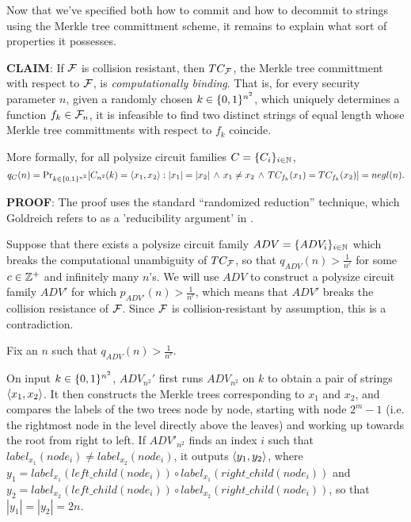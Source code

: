 \documentclass[12pt,twoside]{article}
\begin{document}
Now that we've specified both how to commit and how to decommit to strings 
using the Merkle tree committment scheme, it remains to explain what sort of 
properties it possesses. 

\medskip \noindent
{\bf CLAIM}: If $\fanf$ is collision resistant, then $TC_\fanf$, the Merkle 
tree committment with respect to $\fanf$, is {\it computationally binding}. 
That is, for every security parameter $n$, given a randomly chosen $k \in 
\strs{n^2}$, which uniquely determines a function $f_k \in \fanf_n$, it is 
infeasible to find two distinct strings of equal length whose Merkle tree 
committments with respect to $f_k$ coincide. 

More formally, for all polysize circuit families $C = \ens{C}{i}$, 
\[
q_C(n) = \pr{C_{n^2}(k) = \enc{x_1,x_2} : 
|x_1| = |x_2| \, \wedge \, x_1 \neq x_2 \, \wedge \, \merk{x_1}{k} = 
\merk{x_2}{k}}{k}{\strs{n^2}} = negl(n).
\]

\medskip \noindent
{\bf PROOF}: The proof uses the standard ``randomized reduction'' technique,
which Goldreich refers to as a 'reducibility argument' in
\cite{goldreich:foundations1}. 

Suppose that there exists a polysize circuit family $ADV = \ens{ADV}{i}$ which
breaks the computational unambiguity of $TC_{\fanf}$, so that  
$q_{ADV}(n) > \frac{1}{n^c}$ for some $c \in \pints$ and infinitely many 
$n$'s. We will use $ADV$ to construct a polysize circuit family $ADV'$ for 
which $p_{ADV'}(n) > \frac{1}{n^c}$, which means that $ADV'$ breaks the 
collision resistance of $\fanf$. Since $\fanf$ is collision-resistant 
by assumption, this is a contradiction.

Fix an $n$ such that $q_{ADV}(n) > \frac{1}{n^c}$. 

On input $k \in \strs{n^2}$, $ADV_{n^2}'$ first runs $ADV_{n^2}$ on
$k$ to obtain a pair of strings $\enc{x_1,x_2}$. It then constructs the Merkle
trees corresponding to $x_1$ and $x_2$, and compares the labels of the two
trees node by node, starting with node $2^{m} - 1$ (i.e. the rightmost node in 
the level directly above the leaves) and working up towards the root from
right to left. If $ADV'_{n^2}$ finds an index $i$ such that
$label_{x_1}(node_i)\neq label_{x_2}(node_i)$, it outputs $\enc{y_1,y_2}$, 
where $y_1 = label_{x_1}(left\_child(node_i))\circ 
label_{x_1}(right\_child(node_i))$ and 
$y_2 = label_{x_2}(left\_child(node_i))\circ 
label_{x_2}(right\_child(node_i))$, so that $|y_1| = |y_2| = 2n$.
\end{document}
